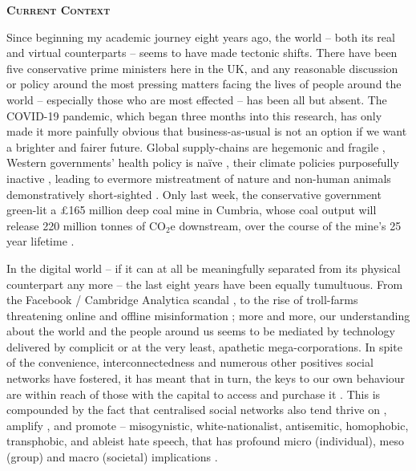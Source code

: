 \newpage
{}
{}
\begin{flushleft}
	\Huge \textsc{\textbf{Current Context}}
	
\end{flushleft}

\noindent Since beginning my academic journey eight years ago, the world -- both its real and virtual counterparts -- seems to have made tectonic shifts. There have been five conservative prime ministers here in the UK, and any reasonable discussion or policy around the most pressing matters facing the lives of people around the world -- especially those who are most effected -- has been all but absent. The COVID-19 pandemic, which began three months into this research, has only made it more painfully obvious that business-as-usual is not an option if we want a brighter and fairer future. Global supply-chains are hegemonic and fragile \citep{gomez2020}, Western governments' health policy is naïve \citep{navarro2021}, their climate policies purposefully inactive \citep{slawinski2017}, leading to evermore mistreatment of nature and non-human animals demonstratively short-sighted \citep{monbiot2022}. Only last week, the conservative government green-lit a £165 million deep coal mine in Cumbria, whose coal output will release 220 million tonnes of CO$_2$e downstream, over the course of the mine's 25 year lifetime \citep[Grubb and Barrett in][p. 252]{grubb2022}.

In the digital world -- if it can at all be meaningfully separated from its physical counterpart any more -- the last eight years have been equally tumultuous. From the Facebook / Cambridge Analytica scandal \citep{isaak2018}, to the rise of troll-farms threatening online and offline misinformation \citep{badawy2018}; more and more, our understanding about the world and the people around us seems to be mediated by technology delivered by complicit or at the very least, apathetic mega-corporations. In spite of the convenience, interconnectedness and numerous other positives social networks have fostered, it has meant that in turn, the keys to our own behaviour are within reach of those with the capital to access and purchase it \citep{zuboff2019}. This is compounded by the fact that centralised social networks also tend thrive on \citep{thorleifsson2022}, amplify \citep{mathew2019}, and promote \citep{ccdh2022,adl2022}  -- misogynistic, white-nationalist, antisemitic, homophobic, transphobic, and ableist hate speech, that has profound micro (individual), meso (group) and macro (societal) implications \citep{alkiviadou2019}. 

